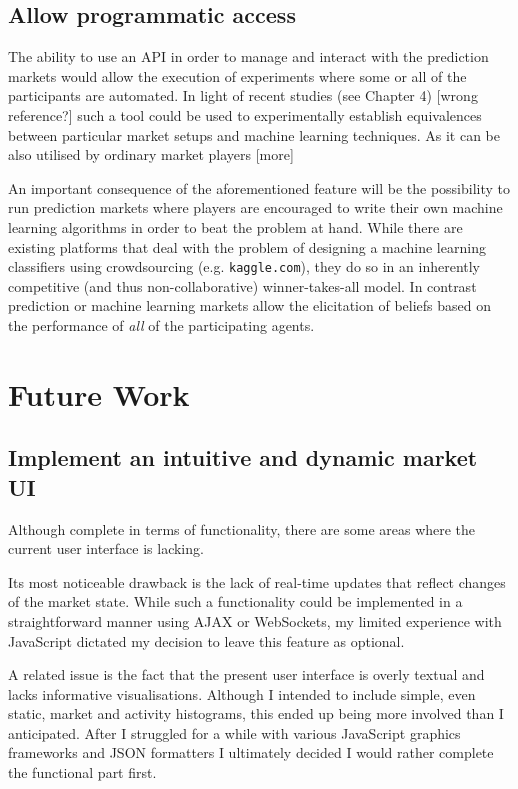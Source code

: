 \documentclass[bsc,frontabs,twoside,singlespacing,parskip,deptreport]{infthesis}     %
\begin{document}
\subsection{Allow programmatic access}
    The ability to use an API in order to manage and interact with the prediction markets would allow the execution of experiments where some or all of the participants are automated. In light of recent studies (see Chapter 4) [wrong reference?] such a tool could be used to experimentally establish equivalences between particular market setups and machine learning techniques. As it can be also utilised by ordinary market players [more]

    An important consequence of the aforementioned  feature will be the possibility to run prediction markets where players are encouraged to write their own machine learning algorithms in order to beat the problem at hand. While there are existing platforms that deal with the problem of designing a machine learning classifiers using crowdsourcing (e.g. {\tt kaggle.com}), they do so in an inherently competitive (and thus non-collaborative) winner-takes-all model. In contrast prediction or machine learning markets allow the elicitation of beliefs based on the performance of {\em all} of the participating agents.
    

\section{Future Work}

\subsection{Implement an intuitive and dynamic market UI}
    Although complete in terms of functionality, there are some areas where the current user interface is lacking.
    
    Its most noticeable drawback is the lack of real-time updates that reflect changes of the market state. While such a functionality could be implemented in a straightforward manner using AJAX or WebSockets, my limited experience with JavaScript dictated my decision to leave this feature as optional. 
    
    A related issue is the fact that the present user interface is overly textual and lacks informative visualisations. Although I intended to include simple, even static, market and activity histograms, this ended up being more involved than I anticipated. After I struggled for a while with various JavaScript graphics frameworks and JSON formatters I ultimately decided I would rather complete the functional part first.  
\end{document}
